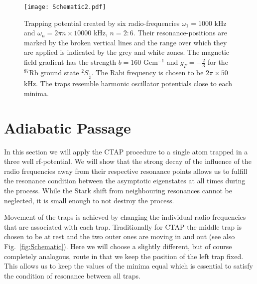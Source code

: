 \begin{figure}[tb]
  \texttt{[image: Schematic2.pdf]}
  \caption{Trapping potential created by six radio-frequencies
    $\omega_1=1000$ kHz and $\omega_n=2\pi n\times 10000$ kHz,
    $n=2:6$. Their resonance-positions are marked by the broken
    vertical lines and the range over which they are applied is
    indicated by the grey and white zones. The magnetic field gradient
    has the strength $b=160$ Gcm$^{-1}$ and $g_F=-\frac{2}{3}$ for the
    $^{87}$Rb ground state $^{2}S_\frac{1}{2}$. The Rabi frequency is
    chosen to be $2 \pi \times 50$ kHz. The traps resemble harmonic
    oscillator potentials close to each minima. }
\label{fig:rfSchematic}
\end{figure}


\section{Adiabatic Passage}
\label{sec:AtomicTransport}

In this section we will apply the CTAP procedure to a single atom
trapped in a three well rf-potential. We will show that the strong
decay of the influence of the radio frequencies away from their
respective resonance points allows us to fulfill the resonance
condition between the asymptotic eigenstates at all times during the
process. While the Stark shift from neighbouring resonances cannot be
neglected, it is small enough to not destroy the process.

Movement of the traps is achieved by changing the individual radio
frequencies that are associated with each trap. Traditionally for CTAP
the middle trap is chosen to be at rest and the two outer ones are
moving in and out (see also Fig.~\ref{fig:Schematic}). Here we will
choose a slightly different, but of course completely analogous, route
in that we keep the position of the left trap fixed. This allows us to 
keep the values of the minima equal which is essential to satisfy the 
condition of resonance between all traps.

